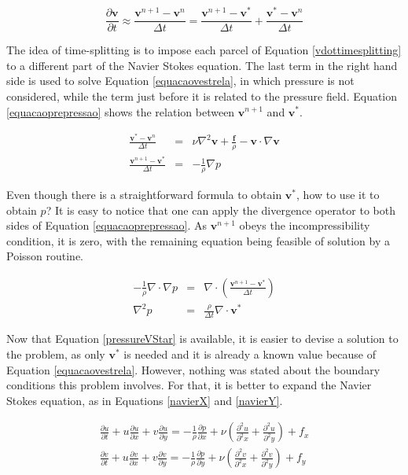 \documentclass[journal]{IEEEtran}
\begin{document}
\begin{equation}
\frac{\partial \textbf{v}}{\partial t}\approx \frac{\textbf{v}^{n+1}-\textbf{v}^n}{\Delta t}=\frac{\textbf{v}^{n+1}-\textbf{v}^*}{\Delta t}+\frac{\textbf{v}^{*}-\textbf{v}^n}{\Delta t} \label{vdottimesplitting}
\end{equation}

The idea of time-splitting is to impose each parcel of Equation \ref{vdottimesplitting} to a different part of the Navier Stokes equation. The last term in the right hand side is used to solve Equation \ref{equacaovestrela}, in which pressure is not considered, while the term just before it is related to the pressure field. Equation \ref{equacaoprepressao} shows the relation between $\mathbf{v}^{n+1}$ and $\mathbf{v}^{*}$. 

\begin{eqnarray}
\frac{\textbf{v}^{*}-\textbf{v}^n}{\Delta t}&=& \nu\nabla ^2 \textbf{v} + \frac{\textbf{f}}{\rho} - \textbf{v}\cdot \nabla \textbf{v}\label{equacaovestrela}\\
\frac{\textbf{v}^{n+1}-\textbf{v}^*}{\Delta t}&=&-\frac{1}{\rho}\nabla p\label{equacaoprepressao}
\end{eqnarray}

Even though there is a straightforward formula to obtain $\mathbf{v}^{*}$, how to use it to obtain $p$? It is easy to notice that one can apply the divergence operator to both sides of Equation \ref{equacaoprepressao}. As $\mathbf{v}^{n+1}$ obeys the incompressibility condition, it is zero, with the remaining equation being feasible of solution by a Poisson routine.

\begin{eqnarray}
	-\frac{1}{\rho}\nabla\cdot\nabla p\nonumber & = &\nabla\cdot \left(\frac{\textbf{v}^{n+1}-\textbf{v}^*}{\Delta t}\right)\\
\nabla^2 p & = & \frac{\rho}{\Delta t}\nabla\cdot \textbf{v}^{*}	 \label{pressureVStar}
\end{eqnarray}

Now that Equation \ref{pressureVStar} is available, it is easier to devise a solution to the problem, as only $\mathbf{v}^*$ is needed and it is already a known value because of Equation \ref{equacaovestrela}. However, nothing was stated about the boundary conditions this problem involves. For that, it is better to expand the Navier Stokes equation, as in Equations \ref{navierX} and \ref{navierY}.

\begin{eqnarray}
\frac{\partial u}{\partial t}+u\frac{\partial u}{\partial x}+v\frac{\partial
u}{\partial y}=-\frac{1}{\rho}\frac{\partial p}{\partial
x}+\nu\left(\frac{\partial^2 u}{\partial^2 x}+\frac{\partial^2 u}{\partial^2
y}\right)+f_x \label{navierX}\\
\frac{\partial v}{\partial t}+u\frac{\partial v}{\partial x}+v\frac{\partial
v}{\partial y}=-\frac{1}{\rho}\frac{\partial p}{\partial
y}+\nu\left(\frac{\partial^2 v}{\partial^2 x}+\frac{\partial^2 v}{\partial^2
y}\right)+f_y \label{navierY}
\end{eqnarray}
\end{document}
